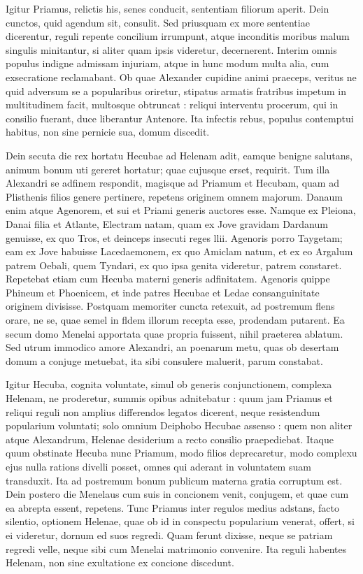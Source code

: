 \documentclass{article}
\begin{document}
\begin{pages}
\begin{Rightside}
Igitur Priamus, relictis his, senes conducit, sententiam filiorum aperit. Dein cunctos, quid agendum sit, consulit. Sed priusquam ex more sententiae dicerentur, reguli repente concilium irrumpunt, atque inconditis moribus malum singulis minitantur, si aliter quam ipsis videretur, decernerent. Interim omnis populus indigne admissam injuriam, atque in hunc modum multa alia, cum exsecratione reclamabant. Ob quae Alexander cupidine animi praeceps, veritus ne quid adversum se a popularibus oriretur, stipatus armatis fratribus impetum in multitudinem facit, multosque obtruncat : reliqui interventu procerum, qui in consilio fuerant, duce liberantur Antenore. Ita infectis rebus, populus contemptui habitus, non sine pernicie sua, domum discedit.

Dein secuta die rex hortatu Hecubae ad Helenam adit, eamque benigne salutans, animum bonum uti gereret hortatur; quae cujusque erset, requirit. Tum illa Alexandri se adfinem respondit, magisque ad Priamum et Hecubam, quam ad Plisthenis filios genere pertinere, repetens originem omnem majorum. Danaum enim atque Agenorem, et sui et Priami generis auctores esse. Namque ex Pleiona, Danai filia et Atlante, Electram natam, quam ex Jove gravidam Dardanum genuisse, ex quo Tros, et deinceps insecuti reges llii. Agenoris porro Taygetam; eam ex Jove habuisse Lacedaemonem, ex quo Amiclam natum, et ex eo Argalum patrem Oebali, quem Tyndari, ex quo ipsa genita videretur, patrem constaret. Repetebat etiam cum Hecuba materni generis adfinitatem. Agenoris quippe Phineum et Phoenicem, et inde patres Hecubae et Ledae consanguinitate originem divisisse. Postquam memoriter cuncta retexuit, ad postremum flens orare, ne se, quae semel in fldem illorum recepta esse, prodendam putarent. Ea secum domo Menelai apportata quae propria fuissent, nihil praeterea ablatum. Sed utrum immodico amore Alexandri, an poenarum metu, quas ob desertam domum a conjuge metuebat, ita sibi consulere maluerit, parum constabat.

Igitur Hecuba, cognita voluntate, simul ob generis conjunctionem, complexa Helenam, ne proderetur, summis opibus adnitebatur : quum jam Priamus et reliqui reguli non amplius differendos legatos dicerent, neque resistendum popularium voluntati; solo omnium Deiphobo Hecubae assenso : quem non aliter atque Alexandrum, Helenae desiderium a recto consilio praepediebat. Itaque quum obstinate Hecuba nunc Priamum, modo filios deprecaretur, modo complexu ejus nulla rations divelli posset, omnes qui aderant in voluntatem suam transduxit. Ita ad postremum bonum publicum materna gratia corruptum est. Dein postero die Menelaus cum suis in concionem venit, conjugem, et quae cum ea abrepta essent, repetens. Tunc Priamus inter regulos medius adstans, facto silentio, optionem Helenae, quae ob id in conspectu popularium venerat, offert, si ei videretur, dornum ed suos regredi. Quam ferunt dixisse, neque se patriam regredi velle, neque sibi cum Menelai matrimonio convenire. Ita reguli habentes Helenam, non sine exultatione ex concione discedunt.


\endnumbering
\end{Rightside}

\end{pages}
\Pages
\end{document}
